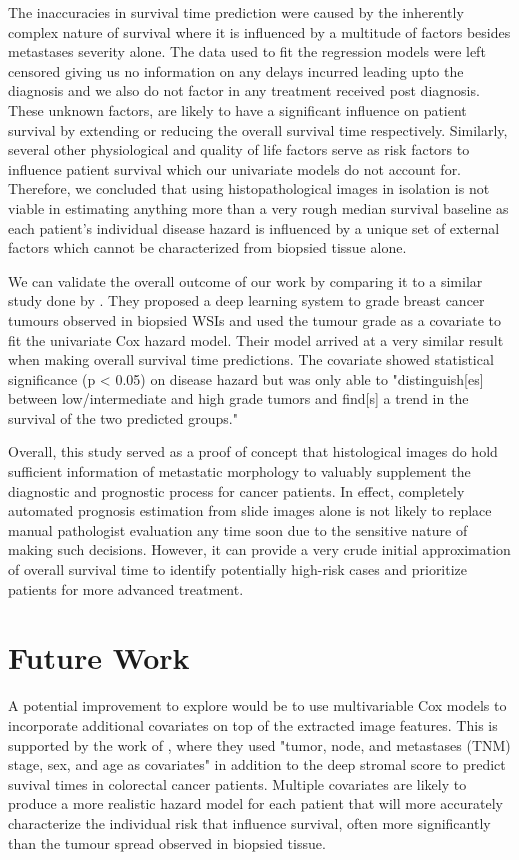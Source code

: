 \documentclass{l4proj}
\begin{document}
The inaccuracies in survival time prediction were caused by the inherently complex nature of survival where it is influenced by a multitude of factors besides metastases severity alone. The data used to fit the regression models were left censored giving us no information on any delays incurred leading upto the diagnosis and we also do not factor in any treatment received post diagnosis. These unknown factors, are likely to have a significant influence on patient survival by extending or reducing the overall survival time respectively. Similarly, several other physiological and quality of life factors serve as risk factors to influence patient survival which our univariate models do not account for. Therefore, we concluded that using histopathological images in isolation is not viable in estimating anything more than a very rough median survival baseline as each patient's individual disease hazard is influenced by a unique set of external factors which cannot be characterized from biopsied tissue alone. 

We can validate the overall outcome of our work by comparing it to a similar study done by \cite{Wetstein2022}. They proposed a deep learning system to grade breast cancer tumours observed in biopsied WSIs and used the tumour grade as a covariate to fit the univariate Cox hazard model. Their model arrived at a very similar result when making overall survival time predictions. The covariate showed statistical significance (p < 0.05) on disease hazard but was only able to "distinguish[es] between low/intermediate and high grade tumors and find[s] a trend in the survival of the two predicted groups." 

 Overall, this study served as a proof of concept that histological images do hold sufficient information of metastatic morphology to valuably supplement the diagnostic and prognostic process for cancer patients. In effect, completely automated prognosis estimation from slide images alone is not likely to replace manual pathologist evaluation any time soon due to the sensitive nature of making such decisions. However, it can provide a very crude initial approximation of overall survival time to identify potentially high-risk cases and prioritize patients for more advanced treatment.


\section{Future Work}
A potential improvement to explore would be to use multivariable Cox models to incorporate additional covariates on top of the extracted image features. This is supported by the work of \cite{Kather2019}, where they used  "tumor, node, and metastases (TNM) stage, sex, and age as covariates" in addition to the deep stromal score to predict suvival times in colorectal cancer patients. Multiple covariates are likely to produce a more realistic hazard model for each patient that will more accurately characterize the individual risk that influence survival, often more significantly than the tumour spread observed in biopsied tissue. 
\end{document}
